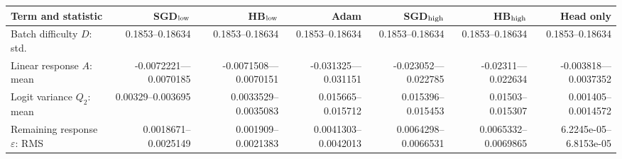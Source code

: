 \begin{tabular}{lrrrrrr}
\hline
Term and statistic & SGD$_{\rm low}$ & HB$_{\rm low}$ & Adam & SGD$_{\rm high}$ & HB$_{\rm high}$ & Head only \\
\hline
Batch difficulty $D$: std. & 0.1853--0.18634 & 0.1853--0.18634 & 0.1853--0.18634 & 0.1853--0.18634 & 0.1853--0.18634 & 0.1853--0.18634 \\
Linear response $A$: mean & -0.0072221---0.0070185 & -0.0071508---0.0070151 & -0.031325---0.031151 & -0.023052---0.022785 & -0.02311---0.022634 & -0.003818---0.0037352 \\
Logit variance $Q_2$: mean & 0.00329--0.003695 & 0.0033529--0.0035083 & 0.015665--0.015712 & 0.015396--0.015453 & 0.01503--0.015307 & 0.001405--0.0014572 \\
Remaining response $\varepsilon$: RMS & 0.0018671--0.0025149 & 0.001909--0.0021383 & 0.0041303--0.0042013 & 0.0064298--0.0066531 & 0.0065332--0.0069865 & 6.2245e-05--6.8153e-05 \\
\hline
\end{tabular}

